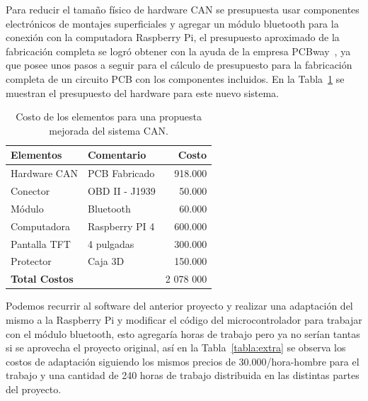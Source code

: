 Para reducir el tamaño físico de hardware CAN se presupuesta usar componentes electrónicos de montajes superficiales y agregar un módulo bluetooth para la conexión con la computadora Raspberry Pi, el presupuesto aproximado de la fabricación completa se logró obtener con la ayuda de la empresa PCBway~\cite{pcbway}, ya que posee unos pasos a seguir para el cálculo de presupuesto para la fabricación completa de un circuito PCB con los componentes incluidos. 
En la Tabla~\ref{tabla:raspberri} se muestran el presupuesto del hardware para este nuevo sistema.
\begin{table}[H]
\begin{center}
\begin{tabular}{ l l r}
\toprule
\textbf{Elementos} & \textbf{Comentario} & \textbf{Costo}  \\ 
\midrule
Hardware CAN    & PCB Fabricado    & 918.000 \\ %
Conector        & OBD II - J1939     & 50.000 \\ %
Módulo          & Bluetooth          & 60.000 \\ %
Computadora     & Raspberry PI 4    & 600.000 \\ %
Pantalla TFT    & 4 pulgadas         & 300.000 \\ %
Protector       & Caja 3D            & 150.000\\ %
\textbf{Total Costos}&  &2 078 000 \\ 
\bottomrule


\end{tabular}
\caption{Costo de los elementos para una propuesta mejorada del sistema CAN.}
\label{tabla:raspberri}
\end{center}
\end{table}


Podemos recurrir al software del anterior proyecto y realizar una adaptación del mismo a la Raspberry Pi y modificar el código del microcontrolador para trabajar con el módulo bluetooth, esto agregaría horas de trabajo pero ya no serían tantas si se aprovecha el proyecto original, así en la Tabla~\ref{tabla:extra} se observa los costos de adaptación siguiendo los mismos precios de 30.000/hora-hombre para el trabajo y una cantidad de 240 horas de trabajo distribuida en las distintas partes del proyecto.  

